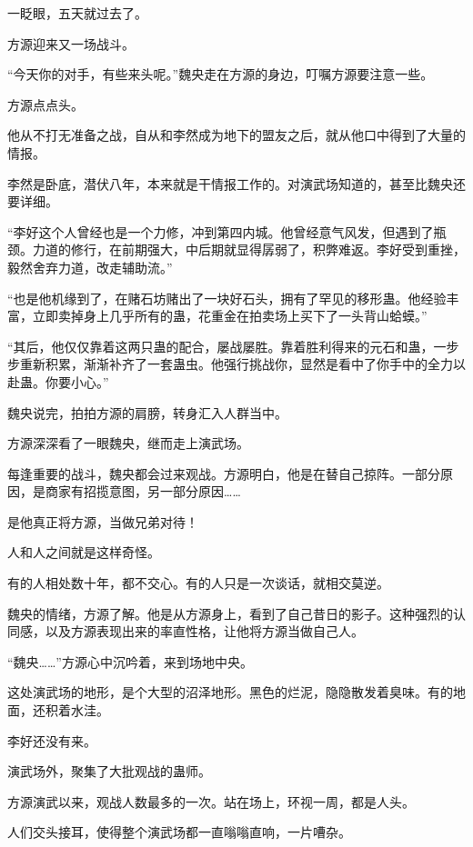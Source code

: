 
\begin{this_body}

一眨眼，五天就过去了。

方源迎来又一场战斗。

“今天你的对手，有些来头呢。”魏央走在方源的身边，叮嘱方源要注意一些。

方源点点头。

他从不打无准备之战，自从和李然成为地下的盟友之后，就从他口中得到了大量的情报。

李然是卧底，潜伏八年，本来就是干情报工作的。对演武场知道的，甚至比魏央还要详细。

“李好这个人曾经也是一个力修，冲到第四内城。他曾经意气风发，但遇到了瓶颈。力道的修行，在前期强大，中后期就显得孱弱了，积弊难返。李好受到重挫，毅然舍弃力道，改走辅助流。”

“也是他机缘到了，在赌石坊赌出了一块好石头，拥有了罕见的移形蛊。他经验丰富，立即卖掉身上几乎所有的蛊，花重金在拍卖场上买下了一头背山蛤蟆。”

“其后，他仅仅靠着这两只蛊的配合，屡战屡胜。靠着胜利得来的元石和蛊，一步步重新积累，渐渐补齐了一套蛊虫。他强行挑战你，显然是看中了你手中的全力以赴蛊。你要小心。”

魏央说完，拍拍方源的肩膀，转身汇入人群当中。

方源深深看了一眼魏央，继而走上演武场。

每逢重要的战斗，魏央都会过来观战。方源明白，他是在替自己掠阵。一部分原因，是商家有招揽意图，另一部分原因……

是他真正将方源，当做兄弟对待！

人和人之间就是这样奇怪。

有的人相处数十年，都不交心。有的人只是一次谈话，就相交莫逆。

魏央的情绪，方源了解。他是从方源身上，看到了自己昔日的影子。这种强烈的认同感，以及方源表现出来的率直性格，让他将方源当做自己人。

“魏央……”方源心中沉吟着，来到场地中央。

这处演武场的地形，是个大型的沼泽地形。黑色的烂泥，隐隐散发着臭味。有的地面，还积着水洼。

李好还没有来。

演武场外，聚集了大批观战的蛊师。

方源演武以来，观战人数最多的一次。站在场上，环视一周，都是人头。

人们交头接耳，使得整个演武场都一直嗡嗡直响，一片嘈杂。


\end{this_body}
